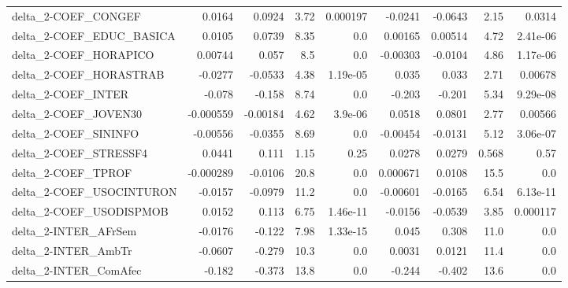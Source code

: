 \begin{tabular}{lrrrrrrrr}
delta\_2-COEF\_CONGEF                   &      0.0164 &       0.0924 &     3.72 & 0.000197 &    -0.0241 &     -0.0643 &         2.15 &        0.0314 \\
delta\_2-COEF\_EDUC\_BASICA              &      0.0105 &       0.0739 &     8.35 &      0.0 &    0.00165 &     0.00514 &         4.72 &      2.41e-06 \\
delta\_2-COEF\_HORAPICO                 &     0.00744 &        0.057 &      8.5 &      0.0 &   -0.00303 &     -0.0104 &         4.86 &      1.17e-06 \\
delta\_2-COEF\_HORASTRAB                &     -0.0277 &      -0.0533 &     4.38 & 1.19e-05 &      0.035 &       0.033 &         2.71 &       0.00678 \\
delta\_2-COEF\_INTER                    &      -0.078 &       -0.158 &     8.74 &      0.0 &     -0.203 &      -0.201 &         5.34 &      9.29e-08 \\
delta\_2-COEF\_JOVEN30                  &   -0.000559 &     -0.00184 &     4.62 &  3.9e-06 &     0.0518 &      0.0801 &         2.77 &       0.00566 \\
delta\_2-COEF\_SININFO                  &    -0.00556 &      -0.0355 &     8.69 &      0.0 &   -0.00454 &     -0.0131 &         5.12 &      3.06e-07 \\
delta\_2-COEF\_STRESSF4                 &      0.0441 &        0.111 &     1.15 &     0.25 &     0.0278 &      0.0279 &        0.568 &          0.57 \\
delta\_2-COEF\_TPROF                    &   -0.000289 &      -0.0106 &     20.8 &      0.0 &   0.000671 &      0.0108 &         15.5 &           0.0 \\
delta\_2-COEF\_USOCINTURON              &     -0.0157 &      -0.0979 &     11.2 &      0.0 &   -0.00601 &     -0.0165 &         6.54 &      6.13e-11 \\
delta\_2-COEF\_USODISPMOB               &      0.0152 &        0.113 &     6.75 & 1.46e-11 &    -0.0156 &     -0.0539 &         3.85 &      0.000117 \\
delta\_2-INTER\_AFrSem                  &     -0.0176 &       -0.122 &     7.98 & 1.33e-15 &      0.045 &       0.308 &         11.0 &           0.0 \\
delta\_2-INTER\_AmbTr                   &     -0.0607 &       -0.279 &     10.3 &      0.0 &     0.0031 &      0.0121 &         11.4 &           0.0 \\
delta\_2-INTER\_ComAfec                 &      -0.182 &       -0.373 &     13.8 &      0.0 &     -0.244 &      -0.402 &         13.6 &           0.0 \\

\end{tabular}
